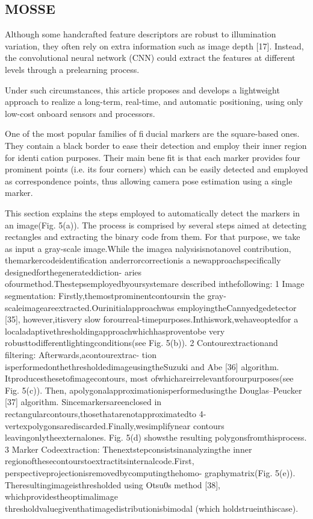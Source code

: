\documentclass[a4paper]{report}
\begin{document}
\subsection{MOSSE}

Although some handcrafted feature descriptors are robust to illumination variation, they often rely on extra information such as image depth [17]. Instead, the
convolutional neural network (CNN) could extract the features
at different levels through a prelearning process.

Under such circumstances, this article proposes and develops
a lightweight approach to realize a long-term, real-time, and
automatic positioning, using only low-cost onboard sensors and
processors.





One of the most popular families of fiducial markers are
the square-based ones. They contain a black border to ease
their detection and employ their inner region for identication
purposes. Their main benefit is that each marker provides
four prominent points (i.e. its four corners) which can
be easily detected and employed as correspondence points,
thus allowing camera pose estimation using a single marker.



This section explains the steps employed to automatically
detect the markers in an image(Fig. 5(a)). The process is
comprised by several steps aimed at detecting rectangles and
extracting the binary code from them. For that purpose, we take as
input a gray-scale image.While the imagea nalysisisnotanovel
contribution, themarkercodeidentification anderrorcorrectionis
a newapproachspecifically designedforthegenerateddiction-
aries ofourmethod.Thestepsemployedbyoursystemare
described inthefollowing:
1 Image segmentation: Firstly,themostprominentcontoursin
the gray-scaleimageareextracted.Ourinitialapproachwas
employingtheCannyedgedetector [35], however,itisvery
slow forourreal-timepurposes.Inthiswork,wehaveoptedfor
a localadaptivethresholdingapproachwhichhasproventobe
very robusttodifferentlightingconditions(see Fig. 5(b)).
2 Contourextractionand filtering: Afterwards,acontourextrac-
tion isperformedonthethresholdedimageusingtheSuzuki
and Abe [36] algorithm. Itproducesthesetofimagecontours,
most ofwhichareirrelevantforourpurposes(see Fig. 5(c)).
Then, apolygonalapproximationisperformedusingthe
Douglas–Peucker [37] algorithm. Sincemarkersareenclosed
in rectangularcontours,thosethatarenotapproximatedto
4-vertexpolygonsarediscarded.Finally,wesimplifynear
contours leavingonlytheexternalones. Fig. 5(d) showsthe
resulting polygonsfromthisprocess.
3 Marker Codeextraction: Thenextstepconsistsinanalyzingthe
inner regionofthesecontourstoextractitsinternalcode.First,
perspectiveprojectionisremovedbycomputingthehomo-
graphymatrix(Fig. 5(e)). Theresultingimageisthresholded
using Otsu0s method [38], whichprovidestheoptimalimage
thresholdvaluegiventhatimagedistributionisbimodal
(which holdstrueinthiscase).
\end{document}
